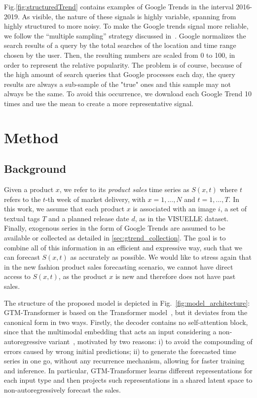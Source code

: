 \documentclass{article}
\newcommand{\datasetname}[0] {VISUELLE}
\newcommand{\approachname}[0] {GTM-Transformer\xspace}
\begin{document}
Fig.\ref{fig:structuredTrend} contains examples of Google Trends in the interval 2016-2019. As visible, the nature of these signals is highly variable, spanning from highly structured to more noisy. To make the Google trends signal more reliable, we follow the ``multiple sampling'' strategy discussed in~\cite{medeiros2021proper}. Google normalizes the search results of a query by the total searches of the location and time range chosen by the user. Then, the resulting numbers are scaled from 0 to 100, in order to represent the relative popularity. The problem is of course, because of the high amount of search queries that Google processes each day, the query results are always a sub-sample of the "true" ones and this sample may not always be the same. To avoid this occurrence, we download each Google Trend 10 times and use the mean to create a more representative signal.
 
\section{Method}\label{sec:method}
\subsection{Background}\label{sec:attention}
Given a product $x$, we refer to its \emph{product sales} time series as $S(x,t)$ where $t$ refers to the $t$-th week of market delivery, with $x=1,...,N$ and $t=1,...,T$. In this work, we assume that each product $x$ is associated with an image $i$, a set of textual tags $T$ and a planned release date $d$, as in the \datasetname{} dataset. Finally, exogenous series in the form of Google Trends are assumed to be available or collected as detailed in \ref{sec:gtrend_collection}. The goal is to combine all of this information in an efficient and expressive way, such that we can forecast $S(x,t)$ as accurately as possible. We would like to stress again that in the new fashion product sales forecasting scenario, we cannot have direct access to $S(x,t)$, as the product $x$ is new and therefore does not have past sales.

The structure of the proposed model is depicted in Fig.~\ref{fig:model_architecture}: \approachname{} is based on the Transformer model~\cite{vaswani2017attention}, but it deviates from the canonical form in two ways. Firstly, the decoder contains no self-attention block, since that the multimodal embedding that acts an input considering a non-autoregressive variant~\cite{gu2017non}, motivated by two reasons: i) to avoid the compounding of errors caused by wrong initial predictions; ii) to generate the forecasted time series in one go, without any recurrence mechanism, allowing for faster training and inference. In particular, \approachname{} learns different representations for each input type and then projects such representations in a shared latent space to non-autoregressively forecast the sales. 
\end{document}
